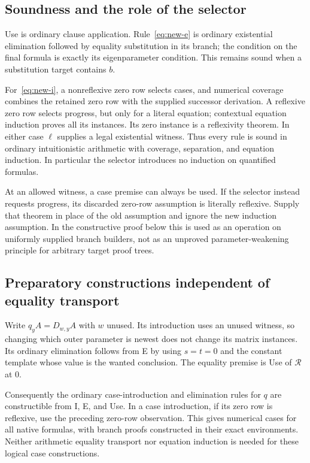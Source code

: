 \subsection{Soundness and the role of the selector}

Use is ordinary clause application.  Rule~\eqref{eq:new-e} is ordinary
existential elimination followed by equality substitution in its branch;
the condition on the final formula is exactly its eigenparameter condition.
This remains sound when a substitution target contains $b$.

For~\eqref{eq:new-i}, a nonreflexive zero row selects cases, and numerical
coverage combines the retained zero row with the supplied successor
derivation.  A reflexive zero row selects progress, but only for a literal
equation; contextual equation induction proves all its instances.  Its
zero instance is a reflexivity theorem.  In either case $\ell$ supplies
a legal existential witness.  Thus every rule is sound in ordinary
intuitionistic arithmetic with coverage, separation, and equation induction.
In particular the selector introduces no induction on quantified formulas.

At an allowed witness, a case premise can always be used.  If the selector
instead requests progress, its discarded zero-row assumption is literally
reflexive.  Supply that theorem in place of the old assumption and ignore
the new induction assumption.  In the constructive proof below this is
used as an operation on uniformly supplied branch builders, not as an
unproved parameter-weakening principle for arbitrary target proof trees.

\subsection{Preparatory constructions independent of equality transport}

Write $q_yA=D_{w,y}A$ with $w$ unused.  Its introduction uses an unused
witness, so changing which outer parameter is newest does not change its
matrix instances.  Its ordinary elimination follows from E by using
$s=t=0$ and the constant template whose value is the wanted conclusion.
The equality premise is Use of $\mathcal R$ at $0$.

Consequently the ordinary case-introduction and elimination rules for $q$
are constructible from I, E, and Use.  In a case introduction, if its zero
row is reflexive, use the preceding zero-row observation.  This gives
numerical cases for all native formulas, with branch proofs constructed
in their exact environments.  Neither arithmetic equality transport nor
equation induction is needed for these logical case constructions.


